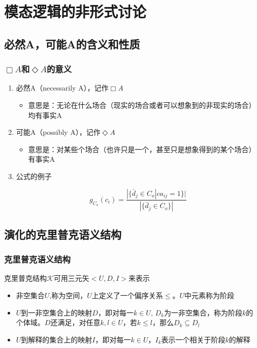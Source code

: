 \documentclass[CJK]{beamer}
\begin{document}

\section{模态逻辑的非形式讨论}

\subsection{必然A，可能A的含义和性质}

\begin{frame}
 \frametitle{$\Box A$和$\Diamond A$的意义}
 \begin{enumerate}
 \item 必然A（necessarily A），记作$\Box A$
   \begin{itemize}
   \item 意思是：无论在什么场合（现实的场合或者可以想象到的非现实的场合）均有事实A
   \end{itemize}
 \item 可能A（possibly A），记作$\Diamond A$
   \begin{itemize}
   \item 意思是：对某些个场合（也许只是一个，甚至只是想象得到的某个场合）有事实A
   \end{itemize}
 \item 公式的例子

\begin{displaymath}
 g_{C_o}(c_i) = \frac{|\{\bar{d}_j\in C_o | ca_{ij} = 1\}|}{|\{\bar{d}_j\in C_o\}|}
\end{displaymath}

 \end{enumerate}
\end{frame}


\subsection{演化的克里普克语义结构}

\begin{frame}
 \frametitle{克里普克语义结构}
克里普克结构$\mathcal{K}$可用三元矢$<U,D,I>$来表示
\begin{itemize}
\item 非空集合$U$,称为\alert{空间}，$U$上定义了一个偏序关系$\leqslant$。$U$中元素称为阶段
\item $U$到一非空集合上的映射$D$，即对每一$k\in U$, $D_k$为一非空集合，称为阶段$k$的\alert{个体域}。$D$还满足，对任意$k,l\in U$，若$k \leqslant l $，那么$D_k \subseteq D_l$
\item $U$到解释的集合上的映射$I$，即对每一$k\in U$，$I_k$表示一个相关于阶段$k$的\alert{解释}
\end{itemize}
\end{frame}
\end{document}

